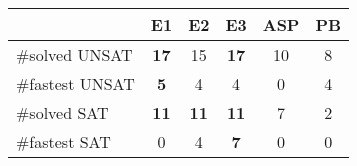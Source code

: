 \begin{tabular}{ l|ccccc }
	&E1	&E2	&E3	&ASP	&PB\\
\hline
\#solved UNSAT	&{\bf 17}	&15	&{\bf 17} &10	&8\\
\#fastest UNSAT	&{\bf 5}	&4	&4	&0	&4\\
\#solved SAT	&{\bf 11}	&{\bf 11}	&\bf{11}	&7	&2\\
\#fastest SAT	&0	&4	&{\bf 7}	&0	&0\\
\hline
\end{tabular}
